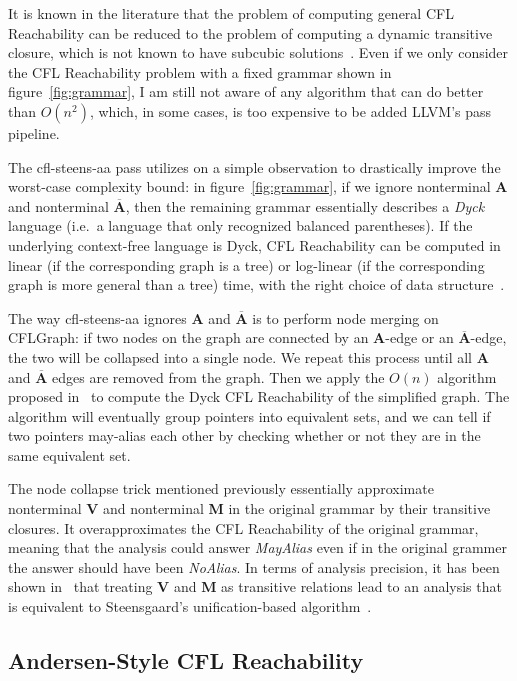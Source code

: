 \documentclass[10pt]{article}
\begin{document}
It is known in the literature that the problem of computing general CFL
Reachability can be reduced to the problem of computing a dynamic
transitive closure, which is not known to have subcubic
solutions~\cite{Reps:1997}. Even if we only consider the CFL Reachability
problem with a fixed grammar shown in figure~\ref{fig:grammar}, I am still not aware
of any algorithm that can do better than $O(n^2)$, which, in some cases, is
too expensive to be added LLVM's pass pipeline. 

The cfl-steens-aa pass utilizes on a simple observation to drastically improve
the worst-case complexity bound: in figure~\ref{fig:grammar}, if we ignore nonterminal
\textbf{A} and nonterminal $\overline{\textbf{A}}$, then the remaining
grammar essentially describes a \emph{Dyck} language (i.e.\ a language that
only recognized balanced parentheses). If the underlying context-free language is
Dyck, CFL Reachability can be computed in linear (if the corresponding
graph is a tree) or log-linear (if the corresponding graph is more general than
a tree) time, with the right choice of data structure~\cite{Zhang:2013}. 

The way cfl-steens-aa ignores \textbf{A} and $\overline{\textbf{A}}$ is to
perform node merging on CFLGraph: if two nodes on the graph are connected by an
\textbf{A}-edge or an $\overline{\textbf{A}}$-edge, the two will be
collapsed into a single node. We repeat this process until all \textbf{A} and
$\overline{\textbf{A}}$ edges are removed from the graph. Then we apply the
$O(n)$ algorithm proposed in~\cite{Zhang:2013} to compute the Dyck CFL Reachability
of the simplified graph. The algorithm will eventually group pointers into
equivalent sets, and we can tell if two pointers may-alias each other by
checking whether or not they are in the same equivalent set.

The node collapse trick mentioned previously essentially approximate nonterminal
\textbf{V} and nonterminal \textbf{M} in the original grammar by their
transitive closures. It overapproximates the CFL Reachability of the original
grammar, meaning that the analysis could answer
\emph{MayAlias} even if in the original grammer the answer should have been \emph{NoAlias}. In terms of
analysis precision, it has been shown in~\cite{Zheng:2008} that treating \textbf{V} and \textbf{M} as
transitive relations lead to an analysis that is equivalent to Steensgaard's
unification-based algorithm~\cite{Steensgaard:1996}.  

\subsection{Andersen-Style CFL Reachability}\label{anders}
\end{document}
